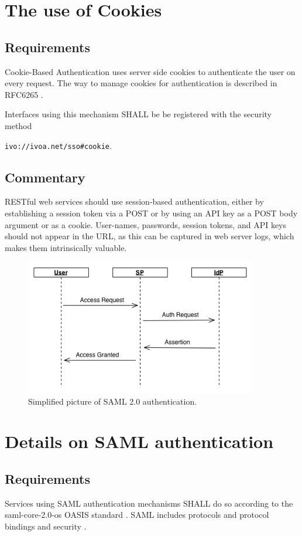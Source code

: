 \documentclass[11pt,a4paper]{ivoa}
\begin{document}
\section{The use of Cookies}
\subsection{Requirements}
Cookie-Based Authentication uses server side cookies to authenticate the user on every request. 
The way to manage  cookies for authentication is described in RFC6265 \citep{std:RFC6265}.

Interfaces using this mechanism SHALL be be registered with the security method 

\texttt{ivo://ivoa.net/sso\#cookie}.


\subsection{Commentary}
RESTful web services should use session-based authentication, either by establishing a session token via a POST or
by using an API key as a POST body argument or as a cookie. 
User-names, passwords, session tokens, and API keys should not appear in the URL, 
as this can be captured in web server logs, which makes them intrinsically valuable.
\begin{figure}
\centering
\includegraphics[width=0.9\textwidth]{SSO_image002.png}
\caption{Simplified picture of SAML 2.0 authentication.}
\label{fig:saml}
\end{figure}

\section{Details on SAML authentication}
\subsection{Requirements}
Services using SAML authentication mechanisms SHALL do so according to the 
saml-core-2.0-os OASIS standard \citep{std:SAML}. 
SAML includes protocols and protocol bindings and security \citep{std:SAMLB}.
\end{document}
